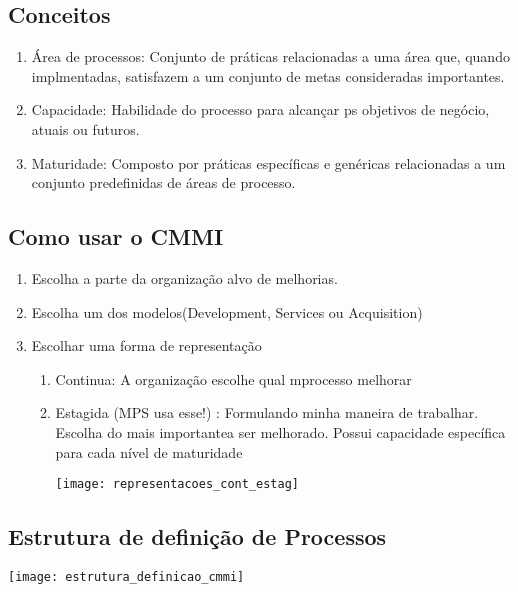 \documentclass{article}
\begin{document}
\subsection{Conceitos}

\begin{enumerate}
\item Área de processos: Conjunto de práticas relacionadas a uma área que, quando implmentadas, satisfazem a um conjunto de metas consideradas importantes.
\item Capacidade: Habilidade do processo para alcançar ps objetivos de negócio, atuais ou futuros.
\item Maturidade: Composto por práticas específicas e genéricas relacionadas a um conjunto predefinidas de áreas de processo.
\end{enumerate}

\subsection{Como usar o CMMI}

\begin{enumerate}
\item Escolha a parte da organização alvo de melhorias.
\item Escolha um dos modelos(Development, Services ou Acquisition)
\item Escolhar uma forma de representação
	\begin{enumerate}
	\item Continua: A organização escolhe qual mprocesso melhorar
	\item Estagida (MPS usa esse!) : Formulando minha maneira de trabalhar. Escolha do mais importantea ser melhorado. Possui capacidade específica para cada nível de maturidade\\
	\begin{center}
		\texttt{[image: representacoes\_cont\_estag]}
	\end{center}	
	\end{enumerate}	 
\end{enumerate}	

\subsection{Estrutura de definição de Processos}
	\begin{center}
		\texttt{[image: estrutura\_definicao\_cmmi]}
	\end{center}
\end{document}
